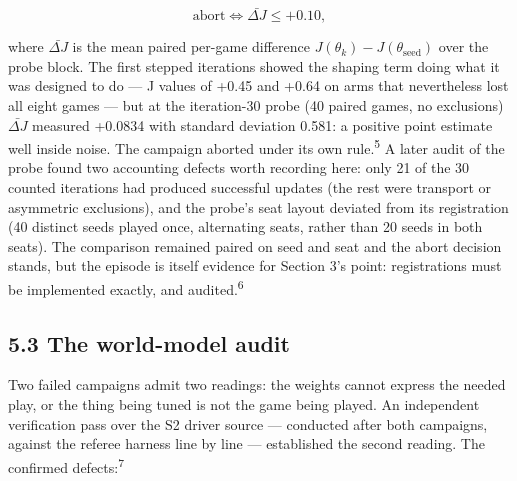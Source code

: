 \documentclass[
  11pt,
]{article}
\begin{document}
\begin{equation}\text{abort} \iff \bar{\Delta J} \le +0.10,
\end{equation}

where \(\bar{\Delta J}\) is the mean paired per-game difference
\(J(\theta_k)
- J(\theta_{\mathrm{seed}})\) over the probe block. The first stepped
iterations showed the shaping term doing what it was designed to do ---
J values of +0.45 and +0.64 on arms that nevertheless lost all eight
games --- but at the iteration-30 probe (40 paired games, no exclusions)
\(\bar{\Delta J}\) measured +0.0834 with standard deviation 0.581: a
positive point estimate well inside noise. The campaign aborted under
its own rule.\textsuperscript{5} A later audit of the probe found two accounting defects
worth recording here: only 21 of the 30 counted iterations had produced
successful updates (the rest were transport or asymmetric exclusions),
and the probe's seat layout deviated from its registration (40 distinct
seeds played once, alternating seats, rather than 20 seeds in both
seats). The comparison remained paired on seed and seat and the abort
decision stands, but the episode is itself evidence for Section 3's
point: registrations must be implemented exactly, and audited.\textsuperscript{6}

\subsection{5.3 The world-model audit}\label{the-world-model-audit}

Two failed campaigns admit two readings: the weights cannot express the
needed play, or the thing being tuned is not the game being played. An
independent verification pass over the S2 driver source --- conducted
after both campaigns, against the referee harness line by line ---
established the second reading. The confirmed defects:\textsuperscript{7}
\end{document}
